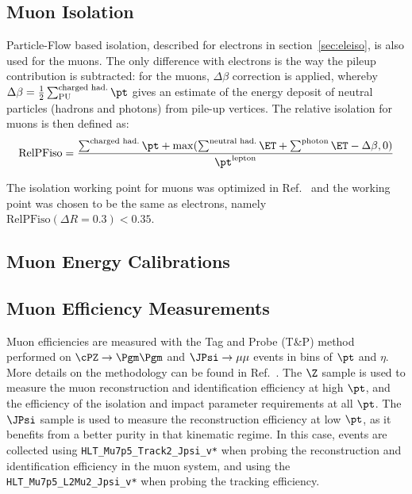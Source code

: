 \subsection{Muon Isolation}
\label{sec:muoniso}

Particle-Flow based isolation, described for electrons in section~\ref{sec:eleiso}, is also used for the muons. 
The only difference with electrons is the way the pileup contribution is subtracted: for the muons, $\Delta\beta$ correction is applied, whereby $\Delta\beta = \frac{1}{2} \sum^\text{charged had.}_\text{PU} \pt$  gives an estimate of the energy deposit of neutral particles (hadrons and photons) from pile-up vertices. 
The relative isolation for muons is then defined as:
\begin{equation}
\text{RelPFiso} = \frac{\sum^\text{charged had.} \pt + \max(\sum^\text{neutral had.} \ET 
+ \sum^\text{photon} \ET - \Delta \beta, 0)}{\pt^\text{lepton}}
\label{eqn:mupfiso}
\end{equation}

The isolation working point for muons was optimized in Ref.~\cite{AN-15-277} and the working point was chosen to be the same as electrons,
namely $\text{RelPFiso}(\Delta R = 0.3) < 0.35$. 


\subsection{Muon Energy Calibrations}
% 

\subsection{Muon Efficiency Measurements}
\label{sec:muonEffMeas}

Muon efficiencies are measured with the Tag and Probe (T\&P) method performed on
$\cPZ \to \Pgm\Pgm$ and $\JPsi\to\mu\mu$ events in bins of $\pt$ and $\eta$. More
details on the methodology can be found in Ref.~\cite{AN-15-277}.
%
The $\Z$ sample is used to measure the muon reconstruction and identification efficiency at high $\pt$,
and the efficiency of the isolation and impact parameter requirements at all $\pt$.
%
The $\JPsi$ sample is used to measure the reconstruction efficiency at low $\pt$,
as it benefits from a better purity in that kinematic regime. In this case,
events are collected using \verb=HLT_Mu7p5_Track2_Jpsi_v*= when probing the
reconstruction and identification efficiency in the muon system, and using the
 \verb=HLT_Mu7p5_L2Mu2_Jpsi_v*= when probing the tracking efficiency.

